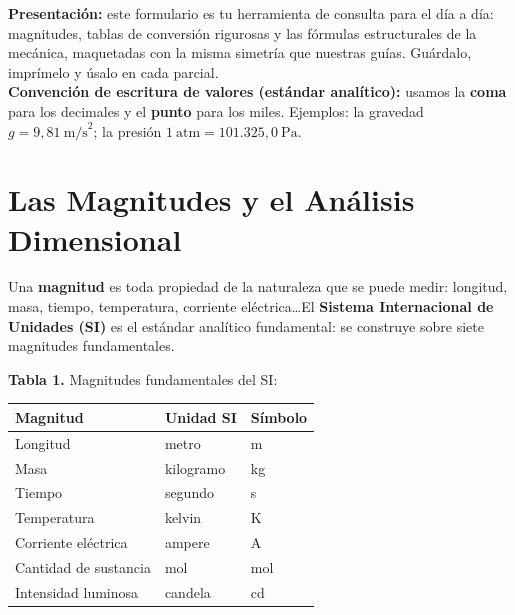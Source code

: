 \documentclass[12pt, letterpaper]{article}
\begin{document}

\vspace{6pt}
\begin{cuadroinfo}
  \small
  \textbf{Presentación:} este formulario es tu herramienta de consulta para el día a día: magnitudes, tablas de conversión rigurosas y las fórmulas estructurales de la mecánica, maquetadas con la misma simetría que nuestras guías. Guárdalo, imprímelo y úsalo en cada parcial.
  \\[4pt]
  \textbf{Convención de escritura de valores (estándar analítico):} usamos la \textbf{coma} para los decimales y el \textbf{punto} para los miles. Ejemplos: la gravedad $g = 9{,}81\ \text{m/s}^2$; la presión $1\ \text{atm} = 101.325{,}0\ \text{Pa}$.
\end{cuadroinfo}

\section{Las Magnitudes y el Análisis Dimensional}

Una \textbf{magnitud} es toda propiedad de la naturaleza que se puede medir: longitud, masa, tiempo, temperatura, corriente eléctrica\ldots El \textbf{Sistema Internacional de Unidades (SI)} es el estándar analítico fundamental: se construye sobre siete magnitudes fundamentales.

\begin{cuadroteoria}
  \textbf{Tabla 1.} Magnitudes fundamentales del SI:
  \begin{center}
    \begin{tabular}{lll}
      \toprule
      \textbf{Magnitud}            & \textbf{Unidad SI}   & \textbf{Símbolo} \\
      \midrule
      Longitud                     & metro               & m                \\
      Masa                         & kilogramo           & kg               \\
      Tiempo                       & segundo             & s                \\
      Temperatura                  & kelvin              & K                \\
      Corriente eléctrica          & ampere              & A                \\
      Cantidad de sustancia        & mol                 & mol              \\
      Intensidad luminosa          & candela             & cd               \\
      \bottomrule
    \end{tabular}
  \end{center}
\end{cuadroteoria}
\end{document}
